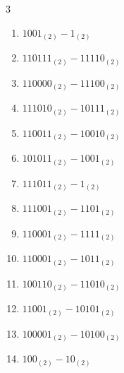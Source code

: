 \begin{multicols}{3}
\begin{enumerate}
  \item $1001_{(2)} - 1_{(2)}$


  \item $110111_{(2)} - 11110_{(2)}$


  \item $110000_{(2)} - 11100_{(2)}$


  \item $111010_{(2)} - 10111_{(2)}$


  \item $110011_{(2)} - 10010_{(2)}$


\columnbreak %

\resetques

  \item $101011_{(2)} - 1001_{(2)}$


  \item $111011_{(2)} - 1_{(2)}$


  \item $111001_{(2)} - 1101_{(2)}$


  \item $110001_{(2)} - 1111_{(2)}$


  \item $110001_{(2)} - 1011_{(2)}$


  \item $100110_{(2)} - 11010_{(2)}$


  \item $11001_{(2)} - 10101_{(2)}$


  \item $100001_{(2)} - 10100_{(2)}$


  \item $100_{(2)} - 10_{(2)}$


\end{enumerate}
\end{multicols}
